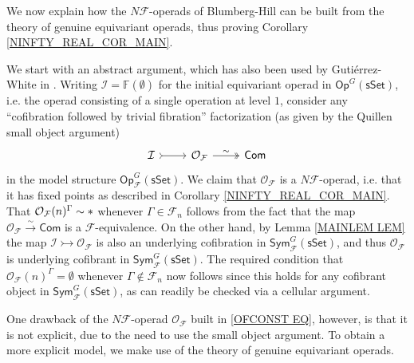 \documentclass[a4paper,10pt
,draft
]{article}%
\numberwithin{equation}{section}
\numberwithin{figure}{section}
\theoremstyle{definition} %
\renewcommand{\O}{\ensuremath{\mathcal O}}
\newcommand{\1}{\ensuremath{\mathbbm 1}}%
\begin{document}
We now explain how the $N\mathcal{F}$-operads of 
Blumberg-Hill can be built from the theory of genuine equivariant operads, thus proving Corollary \ref{NINFTY_REAL_COR_MAIN}.

We start with an abstract argument, which has also been used by Guti\'{e}rrez-White in \cite{GW18}. 
Writing 
$\mathcal{I} = \mathbb{F} (\emptyset)$
for the initial equivariant operad in 
$\mathsf{Op}^G(\mathsf{sSet})$,
i.e. the operad consisting of a single operation at level $1$,
consider any 
``cofibration followed by trivial fibration'' factorization
(as given by the
Quillen small object argument)
\begin{equation}\label{OFCONST EQ}
\begin{tikzcd}
	\mathcal{I} \arrow[r, rightarrowtail] &
	\O_{\mathcal{F}}
	\arrow[r,twoheadrightarrow, "\sim"] &
	\mathsf{Com}
\end{tikzcd}
\end{equation}
in the model structure 
$\mathsf{Op}^G_{\mathcal{F}}(\mathsf{sSet})$.
We claim that $\mathcal{O}_{\mathcal{F}}$
is a $N \mathcal{F}$-operad, i.e.
that it has fixed points as described in 
Corollary \ref{NINFTY_REAL_COR_MAIN}.
That $\mathcal{O}_{\mathcal{F}}(n)^{\Gamma} \sim \**$
whenever $\Gamma \in \mathcal{F}_n$
follows from the fact that the map
$\mathcal{O}_{\mathcal{F}} \xrightarrow{\sim} \mathsf{Com}$
is a $\mathcal{F}$-equivalence.
On the other hand, by Lemma \ref{MAINLEM LEM}
the map 
$\mathcal{I} \rightarrowtail \O_{\mathcal{F}}$
is also an underlying cofibration in 
$\mathsf{Sym}^G_{\mathcal{F}}(\mathsf{sSet})$, and thus
$\mathcal{O}_{\mathcal{F}}$ is underlying cofibrant in 
$\mathsf{Sym}^G_{\mathcal{F}}(\mathsf{sSet})$.
The required condition that
$\mathcal{O}_{\mathcal{F}} (n)^{\Gamma}
= \emptyset $
whenever $\Gamma \nin \mathcal{F}_n$
now follows since this holds for any cofibrant object in $\mathsf{Sym}^G_{\mathcal{F}}(\mathsf{sSet})$,
as can readily be checked via a cellular argument.

One drawback of the 
$N \mathcal{F}$-operad $\mathcal{O}_{\mathcal{F}}$
built in \eqref{OFCONST EQ},
however, is that it is not explicit,
due to the need to use the small object argument.
To obtain a more explicit model, we make use of the theory of genuine equivariant operads.
\end{document}
